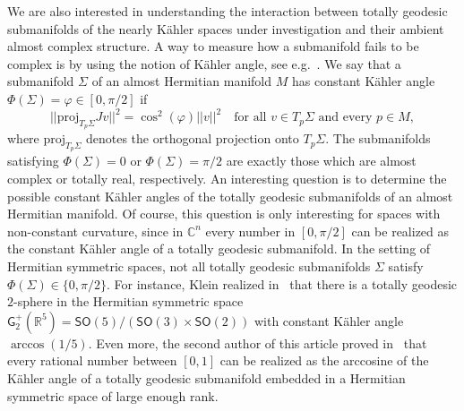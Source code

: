 \documentclass[11pt,a4paper,final]{amsart}
\newcommand{\s}{\mathsf}
\newcommand{\R}{\mathbb{R}}
\newcommand{\C}{\mathbb{C}}
\theoremstyle{definition}
\begin{document}
We are also interested in understanding the interaction between totally geodesic
submanifolds of the nearly Kähler spaces under investigation and their ambient almost
complex structure.
A way to measure how a submanifold fails to be complex is by using the notion of Kähler angle, see e.g.~\cite{bolton}. We say that a submanifold $\Sigma$ of an almost Hermitian manifold $M$ has constant Kähler angle $\Phi(\Sigma)=\varphi\in[0,\pi/2]$ if
\begin{equation*}
	\lvert\lvert \mathrm{proj}_{T_p \Sigma} J v\rvert\rvert^2=\cos^2(\varphi)\lvert \lvert v\rvert \rvert^2 \quad \text{for all $v\in T_p\Sigma$ and every $p\in M$},
\end{equation*}
where $\mathrm{proj}_{T_p \Sigma}$ denotes the orthogonal projection onto $T_p \Sigma$.
The submanifolds satisfying $\Phi(\Sigma)=0$ or $\Phi(\Sigma)=\pi/2$ are exactly those which are almost complex or totally real, respectively.
An interesting question is to determine the possible constant Kähler angles of the totally geodesic submanifolds of an almost Hermitian manifold.
Of course, this  question is only interesting for spaces with non-constant curvature, since in $\C^n$ every number in $[0,\pi/2]$ can be realized as the constant Kähler angle of a totally geodesic submanifold.
In the setting of Hermitian symmetric spaces, not all totally geodesic submanifolds $\Sigma$ satisfy $\Phi(\Sigma)\in\{0,\pi/2\}$.
For instance, Klein realized in~\cite{kleindga} that there is a totally geodesic $2$-sphere in the Hermitian symmetric space $\s{G}^+_2(\R^5)=\s{SO}(5)/(\s{SO}(3)\times\s{SO}(2))$ with constant Kähler angle $\arccos(1/5)$.
Even more, the second author of this article proved in~\cite{products} that every rational number between $[0,1]$ can be realized as the arccosine of the Kähler angle of a totally geodesic submanifold embedded in a Hermitian symmetric space of large enough rank.
\end{document}
